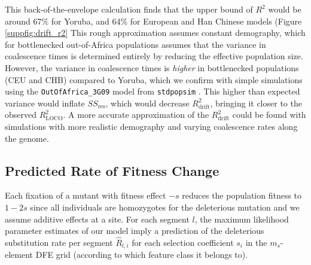 \documentclass[11pt]{article}
\begin{document}
This back-of-the-envelope calculation finds that the upper bound of $R^2$ would
be around 67\% for Yoruba, and 64\% for European and Han Chinese models (Figure
\ref{suppfig:drift_r2} This rough approximation assumes constant demography,
which for bottlenecked out-of-Africa populations assumes that the variance in
coalescence times is determined entirely by reducing the effective population
size. However, the variance in coalescence times is \emph{higher} in
bottlenecked populations (CEU and CHB) compared to Yoruba, which we confirm
with simple simulations using the \texttt{OutOfAfrica\_3G09} model from
\texttt{stdpopsim} \parencite{Gutenkunst2009-pg,Adrion2020-cf}. This higher
than expected variance would inflate $SS_\text{res}$, which would decrease
$R_\text{drift}^2$, bringing it closer to the observed $R_\text{LOCO}^2$. A more
accurate approximation of the $R_\text{drift}^2$ could be found with
simulations with more realistic demography and varying coalescence rates along
the genome.





\subsection{Predicted Rate of Fitness Change}

Each fixation of a mutant with fitness effect $-s$ reduces the population
fitness to $1-2s$ since all individuals are homozygotes for the deleterious
mutation and we assume additive effects at a site. For each segment $l$, the
maximum likelihood parameter estimates of our model imply a prediction of the
deleterious substitution rate per segment $\widehat{R}_{l,i}$ for each
selection coefficient $s_i$ in the $m_s$-element DFE grid (according to which
feature class it belongs to).
\end{document}
